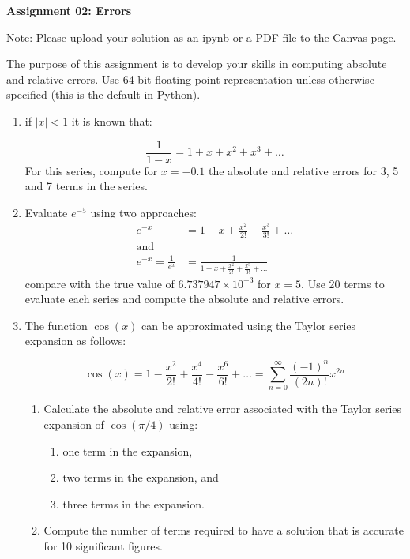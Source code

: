 \documentclass[a4paper,12pt]{article}
\begin{document}
\begin{centering}
	\textbf{
		Assignment 02: Errors\\
	}
\end{centering}


Note: Please upload your solution as an ipynb or a PDF file to the Canvas page.

\vspace{1em}
 
 The purpose of this assignment is to develop your skills in computing absolute and relative errors. Use 64 bit floating point representation unless otherwise specified (this is the default in Python).
 
\begin{enumerate}
	
	\item if $\vert x \vert < 1$ it is known that:
	
	\begin{equation*}
	\frac{1}{1 - x} = 1 + x + x^2 + x^3 + \dots
	\end{equation*}
	For this series, compute for $x = -0.1$ the absolute and relative errors for 3, 5 and 7 terms in the series. 
	
	\item Evaluate $e^{-5}$ using two approaches:
		\begin{align*}
			e^{-x} &  = 1 - x + \frac{x^2}{2!} - \frac{x^3}{3!} + \dots \\
			\mathrm{and}\\
			e^{-x} = \frac{1}{e^x} & = \frac{1}{1 + x + \frac{x^2}{2!} + \frac{x^3}{3!} + \dots} 
		\end{align*}
		compare with the true value of $6.737947 \times 10^{-3}$ for $x = 5$. Use 20 terms to evaluate each series and compute the absolute and relative errors.
		
	\item The function $\cos(x)$ can be approximated using the Taylor series expansion as follows:
	
		\begin{equation*}
		\cos(x) = 1 - \frac{x^2}{2!} + \frac{x^4}{4!} - \frac{x^6}{6!}+ \dots = \sum_{n = 0}^{\infty}\frac{(-1)^n}{(2n)!}x^{2n}
		\end{equation*}
	\begin{enumerate}
	\item Calculate the absolute and relative error associated with the Taylor series expansion of $\cos(\pi/4)$ using:
		\begin{enumerate}
			\item one term in the expansion,
			\item two terms in the expansion, and
			\item three terms in the expansion.
		\end{enumerate}
	\item Compute the number of terms required to have a solution that is accurate for 10 significant figures.		
	\end{enumerate}


\end{enumerate}
\end{document}

